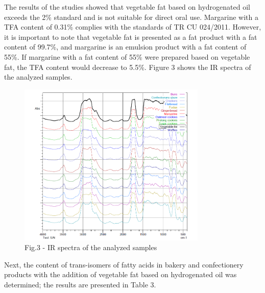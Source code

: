 The results of the studies showed that vegetable fat based on
hydrogenated oil exceeds the 2\% standard and is not suitable for direct
oral use. Margarine with a TFA content of 0.31\% complies with the
standards of TR CU 024/2011. However, it is important to note that
vegetable fat is presented as a fat product with a fat content of
99.7\%, and margarine is an emulsion product with a fat content of 55\%.
If margarine with a fat content of 55\% were prepared based on vegetable
fat, the TFA content would decrease to 5.5\%. Figure 3 shows the IR
spectra of the analyzed samples.

\begin{figure}[H]
	\centering
	\includegraphics[width=0.8\textwidth]{media/pish/image12}
	\caption*{Fig.3 - IR spectra of the analyzed samples}
\end{figure}

Next, the content of trans-isomers of fatty acids in bakery and
confectionery products with the addition of vegetable fat based on
hydrogenated oil was determined; the results are presented in Table 3.

